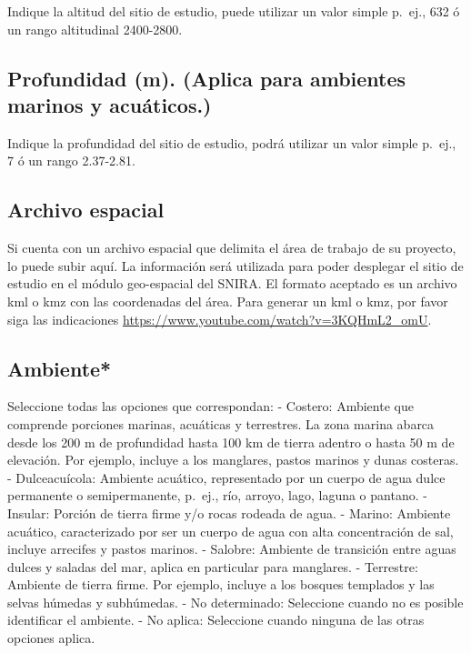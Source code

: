 \documentclass[
]{book}
\begin{document}
Indique la altitud del sitio de estudio, puede utilizar un valor simple p.~ej., 632 ó un rango altitudinal 2400-2800.

\hypertarget{profundidad-m.-aplica-para-ambientes-marinos-y-acuuxe1ticos.}{%
\subsection{Profundidad (m). (Aplica para ambientes marinos y acuáticos.)}\label{profundidad-m.-aplica-para-ambientes-marinos-y-acuuxe1ticos.}}

Indique la profundidad del sitio de estudio, podrá utilizar un valor simple p.~ej., 7 ó un rango 2.37-2.81.

\hypertarget{archivo-espacial}{%
\subsection{Archivo espacial}\label{archivo-espacial}}

Si cuenta con un archivo espacial que delimita el área de trabajo de su proyecto, lo puede subir aquí. La información será utilizada para poder desplegar el sitio de estudio en el módulo geo-espacial del SNIRA.
El formato aceptado es un archivo kml o kmz con las coordenadas del área.
Para generar un kml o kmz, por favor siga las indicaciones \url{https://www.youtube.com/watch?v=3KQHmL2_omU}.

\hypertarget{ambiente}{%
\subsection{Ambiente*}\label{ambiente}}

Seleccione todas las opciones que correspondan:
- Costero: Ambiente que comprende porciones marinas, acuáticas y terrestres. La zona marina abarca desde los 200 m de profundidad hasta 100 km de tierra adentro o hasta 50 m de elevación. Por ejemplo, incluye a los manglares, pastos marinos y dunas costeras.
- Dulceacuícola: Ambiente acuático, representado por un cuerpo de agua dulce permanente o semipermanente, p.~ej., río, arroyo, lago, laguna o pantano.
- Insular: Porción de tierra firme y/o rocas rodeada de agua.
- Marino: Ambiente acuático, caracterizado por ser un cuerpo de agua con alta concentración de sal, incluye arrecifes y pastos marinos.
- Salobre: Ambiente de transición entre aguas dulces y saladas del mar, aplica en particular para manglares.
- Terrestre: Ambiente de tierra firme. Por ejemplo, incluye a los bosques templados y las selvas húmedas y subhúmedas.
- No determinado: Seleccione cuando no es posible identificar el ambiente.
- No aplica: Seleccione cuando ninguna de las otras opciones aplica.
\end{document}
